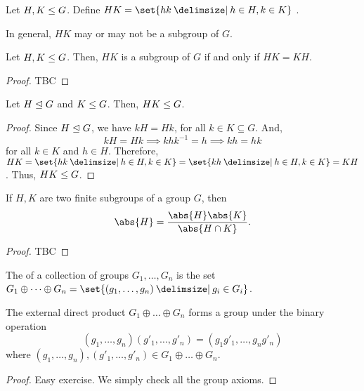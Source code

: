 \documentclass[11pt]{penrose}
\begin{document}
\begin{ndfn}
    Let $H, K \mathrel{\leq} G$. Define $HK = \set{hk \st h \in H, k \in K}$ .
\end{ndfn}

In general, $HK$ may or may not be a subgroup of $G$.

\begin{nthm}
    Let $H, K \mathrel{\leq} G$. Then, $HK$ is a subgroup of $G$ if and only if $HK = KH$.
\end{nthm}
\begin{proof}
    TBC
\end{proof}

\begin{nthm}\label{thm:normal-product-subgroup}
    Let $H \mathrel{\trianglelefteq} G$ and $K \mathrel{\leq} G$. Then, $HK \mathrel{\leq} G$.
\end{nthm}
\begin{proof}
    Since $H \mathrel{\trianglelefteq} G$, we have $kH = Hk$, for all $k \in K \subseteq G$. And,
    \begin{equation*}
        kH = Hk \implies khk^{-1} = h \implies kh = hk
    \end{equation*}
    for all $k \in K$ and $h \in H$. Therefore, $HK = \set{hk \st h \in H, k \in K} = \set{kh \st h \in H, k \in K} = KH$.
    Thus, $HK \mathrel{\leq} G$.
\end{proof}

\begin{nthm}
    If $H, K$ are two finite subgroups of a group $G$, then
    \begin{equation*}
        \abs{H} = \frac{\abs{H} \abs{K}}{\abs{H \cap K}}.
    \end{equation*}
\end{nthm}
\begin{proof}
    TBC
\end{proof}

\begin{ndfn}
    The  of a collection of groups $G_{1}, \dots, G_{n}$ is the set $G_{1} \oplus \dots \oplus G_{n} = \set{ (g_{1}, \dots, g_{n}) \st g_{i} \in G_{i} }$.
\end{ndfn}

\begin{nthm}
    The external direct product $G_{1} \oplus \dots \oplus G_{n}$ forms a group under the binary operation
    \begin{equation*}
        (g_{1}, \dots, g_{n}) (g'_{1}, \dots, g'_{n}) = (g_{1}g'_{1}, \dots, g_{n}g'_{n})
    \end{equation*}
    where $(g_{1}, \dots, g_{n}), (g'_{1}, \dots, g'_{n}) \in G_{1} \oplus \dots \oplus G_{n}$.
\end{nthm}
\begin{proof}
    Easy exercise. We simply check all the group axioms.
\end{proof}
\end{document}
